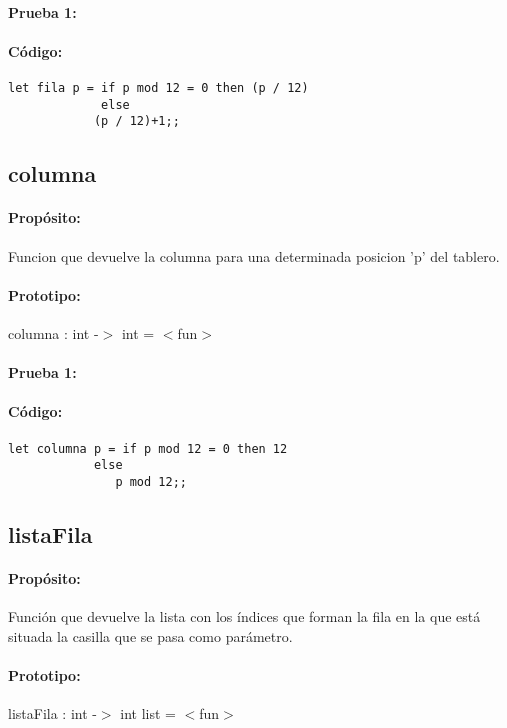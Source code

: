 \paragraph{Prueba 1:}
\paragraph{Código:}
\begin{verbatim}
let fila p = if p mod 12 = 0 then (p / 12) 
             else 
	        (p / 12)+1;;
\end{verbatim}

\subsection{columna}

\paragraph{Propósito:} Funcion que devuelve la columna para una determinada posicion 'p' del
tablero.
\paragraph{Prototipo:} columna : int -$>$ int = $<$fun$>$
\paragraph{Prueba 1:}
\paragraph{Código:}
\begin{verbatim}
let columna p = if p mod 12 = 0 then 12 
	        else 
	           p mod 12;;
\end{verbatim}

\subsection{listaFila}

\paragraph{Propósito:} Función que devuelve la lista con los índices que forman la fila en
la que está situada la casilla que se pasa como parámetro.
\paragraph{Prototipo:} listaFila : int -$>$ int list = $<$fun$>$
